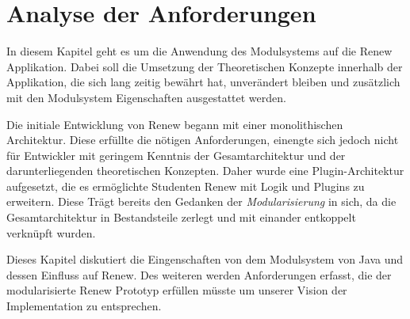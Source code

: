 \chapter{Analyse der Anforderungen}\label{cha:anforderungen}
In diesem Kapitel geht es um die Anwendung des Modulsystems auf die Renew Applikation. Dabei soll die Umsetzung der Theoretischen Konzepte innerhalb der Applikation, die sich lang zeitig bewährt hat, unverändert bleiben und zusätzlich mit den Modulsystem Eigenschaften ausgestattet werden. \bigbreak

Die initiale Entwicklung von Renew begann mit einer monolithischen Architektur. Diese erfüllte die nötigen Anforderungen, einengte sich jedoch nicht für Entwickler mit geringem Kenntnis der Gesamtarchitektur und der darunterliegenden theoretischen Konzepten. Daher wurde eine Plugin-Architektur aufgesetzt, die es ermöglichte Studenten Renew mit Logik und Plugins zu erweitern. Diese Trägt bereits den Gedanken der \textit{Modularisierung} in sich, da die Gesamtarchitektur in Bestandsteile zerlegt und mit einander entkoppelt verknüpft wurden. \bigbreak


Dieses Kapitel diskutiert die Eingenschaften von dem Modulsystem von Java und dessen Einfluss auf Renew. Des weiteren werden Anforderungen erfasst, die der modularisierte Renew Prototyp erfüllen müsste um unserer Vision der Implementation zu entsprechen. 



